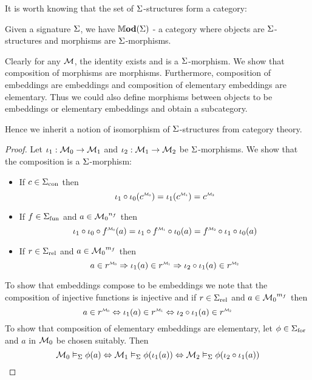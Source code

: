 It is worth knowing that the set of $\Sigma$-structures form a category:
\begin{dfn}
    Given a signature $\Sigma$, 
    we have $\mathbb{M} \mathbf{od}(\Sigma)$ - a category where objects are $\Sigma$-structures 
    and morphisms are $\Sigma$-morphisms.
    
    Clearly for any $\mathcal{M}$, 
    the identity exists and is a $\Sigma$-morphism.
    We show that composition of morphisms are morphisms.
    Furthermore, composition of embeddings are embeddings
    and composition of elementary embeddings are elementary.
    Thus we could also define morphisms between objects to be embeddings
    or elementary embeddings and obtain a subcategory.

    Hence we inherit a notion of isomorphism of $\Sigma$-structures
    from category theory.
\end{dfn}
\begin{proof}
    Let $\iota_1 : \mathcal{M}_0 \to \mathcal{M}_1$ and 
    $\iota_2 : \mathcal{M}_1 \to \mathcal{M}_2$ be $\Sigma$-morphisms.
    We show that the composition is a $\Sigma$-morphism:
    \begin{itemize}
        \item If $c \in {\Sigma}_\mathrm{con}$ then 
            \[
                \io_1 \circ \io_0 (\modintp{\MM_0}{c}) = 
                \io_1 (\modintp{\MM_1}{c}) = \modintp{\MM_2}{c}
            \]
        \item If $f \in {\Sigma}_\mathrm{fun}$ and 
            $a \in {\mathcal{M}_0}^{n_f}$ then
            \[
                \io_1 \circ \io_0 \circ \modintp{\MM_0}{f}(a) = 
                \io_1 \circ \modintp{\MM_1}{f} \circ \io_0 (a) = 
                \modintp{\MM_2}{f} \circ \io_1 \circ \io_0 (a)
            \]
        \item If $r \in {\Sigma}_\mathrm{rel}$ and 
            $a \in {\mathcal{M}_0}^{m_f}$ then
            \[
                a \in \modintp{\MM_0}{r} \implies \io_1 (a) \in \modintp{\MM_1}{r} 
                \implies \io_2 \circ \io_1 (a) \in \modintp{\MM_2}{r}
            \]
    \end{itemize}
    To show that embeddings compose to be embeddings we note that 
    the composition of injective functions is injective 
    and if $r \in {\Sigma}_\mathrm{rel}$ and 
    $a \in {\mathcal{M}_0}^{m_f}$ then
    \[
        a \in \modintp{\MM_0}{r} \iff \io_1 (a) \in \modintp{\MM_1}{r} 
        \iff \io_2 \circ \io_1 (a) \in \modintp{\MM_2}{r}
    \]
    To show that composition of elementary embeddings are elementary,
    let $\phi \in {\Sigma}_\mathrm{for}$ and $a$ in ${\mathcal{M}_0}$ be chosen suitably.
    Then
    \[
        \mathcal{M}_0 \vDash_{\Sigma} \phi(a) \Leftrightarrow \mathcal{M}_1 \vDash_{\Sigma} \phi(\iota_1 (a))
        \Leftrightarrow \mathcal{M}_2 \vDash_{\Sigma} \phi(\iota_2 \circ \iota_1 (a))
    \]
\end{proof}

